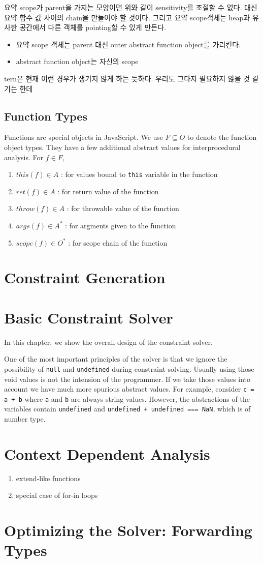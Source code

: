 \documentclass{report}
\begin{document}
요약 scope가 parent을 가지는 모양이면 위와 같이 sensitivity를 조절할 수 없다. 
대신 요약 함수 값 사이의 chain을 만들어야 할 것이다. 그리고 요약 scope객체는 heap과 유사한
공간에서 다른 객체를 pointing할 수 있게 만든다. 
\begin{itemize}
\item 요약 scope 객체는 parent 대신 outer abstract function object를 가리킨다.
\item abstract function object는 자신의 scope
\end{itemize}


tern은 현재 이런 경우가 생기지 않게 하는 듯하다.
우리도 그다지 필요하지 않을 것 같기는 한데


\section{Function Types}
Functions are special objects in JavaScript. 
We use $F \subseteq O$ to denote the function object types.
They have a few additional abstract values for interprocedural analysis.
For $f \in F$,
\begin{enumerate}
\item $this(f) \in A$ : for values bound to \texttt{this} variable 
  in the function
\item $ret(f) \in A$ : for return value of the function
\item $throw(f) \in A$ : for throwable value of the function
\item $args(f) \in A^*$ : for argments given to the function
\item $scope(f) \in O^*$ : for scope chain of the function
\end{enumerate}


\chapter{Constraint Generation}

\chapter{Basic Constraint Solver}

In this chapter, we show the overall design of the constraint solver. 

One of the most important principles of the solver is that 
we ignore the possibility of \texttt{null} and \texttt{undefined} 
during constraint solving.
Usually using those void values is not the intension of the programmer.
If we take those values into account 
we have much more spurious abstract values.
For example, consider \texttt{c = a + b} where \texttt{a} and \texttt{b} 
are always string values. 
However, the abstractions of the variables contain \texttt{undefined} and
\texttt{undefined + undefined === NaN}, which is of number type. 


\chapter{Context Dependent Analysis}
\begin{enumerate}
\item extend-like functions
\item special case of for-in loops
\end{enumerate}

\chapter{Optimizing the Solver: Forwarding Types}
\end{document}
